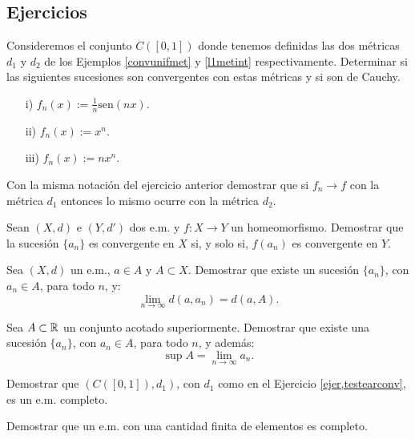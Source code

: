 \subsection{Ejercicios}

\begin{ejercicio}{}\label{ejer,testearconv} Consideremos el conjunto $C([0,1])$ donde
tenemos definidas las dos métricas $d_1$ y $d_2$ de los Ejemplos
\vref{convunifmet} y \vref{l1metint} respectivamente. Determinar
si las siguientes sucesiones son convergentes con estas métricas
y si son de Cauchy.
\begin{itemize}
    \item[i)] $f_n(x):=\frac1n\text{sen}(nx)$.
    \item[ii)] $f_n(x):=x^n$.
    \item[iii)]$f_n(x):=nx^n$.
\end{itemize}
\end{ejercicio}
\begin{ejercicio}{} Con la misma notación del ejercicio anterior
demostrar que si $f_n\to f$ con la métrica  $d_1$ entonces lo
mismo ocurre con la métrica $d_2$.
\end{ejercicio}

\begin{ejercicio}{} Sean $(X,d)$ e $(Y,d')$ dos e.m. y $f:X\to Y$ un homeomorfismo.
Demostrar que la sucesión $\{a_n\}$ es convergente en $X$ si, y
solo si, $f(a_n)$ es convergente en $Y$.
\end{ejercicio}



\begin{ejercicio}{} Sea $(X,d)$ un e.m., $a\in A$ y $A\subset X$. Demostrar
que existe un sucesión $\{a_n\}$, con $a_n\in A$, para todo $n$,
y:
\[\lim\limits_{n\to\infty}d(a,a_n)=d(a,A).\]
\end{ejercicio}

\begin{ejercicio}{} Sea $A\subset \mathbb{R}$ un conjunto acotado
superiormente. Demostrar que existe una sucesión $\{a_n\}$, con
$a_n\in A$, para todo $n$, y además:
\[
    \sup A=\lim\limits_{n\to\infty} a_n.
\]
\end{ejercicio}

\begin{ejercicio}{} Demostrar que $(C([0,1]),d_1)$, con $d_1$ como
en el Ejercicio \ref{ejer,testearconv}, es un e.m. completo.
\end{ejercicio}

\begin{ejercicio}{} Demostrar que un e.m. con una cantidad finita de
elementos es completo.
\end{ejercicio}

